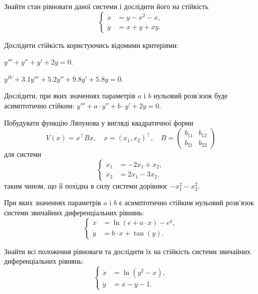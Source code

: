 \begin{problem}
	Знайти стан рівноваги даної системи і дослідити його на стійкість 
	\[\left\{ \begin{aligned} \dot x &= y - x^2 - x, \\ \dot y &= x + y + x y. \end{aligned} \right.\]
\end{problem}

Дослідити стійкість користуючись відомими критеріями:

\begin{problem}
	$y''' + y'' + y' + 2 y = 0$.
\end{problem}

\begin{problem}
	$y^{IV} + 3.1 y''' + 5.2 y'' + 9.8 y' + 5.8 y = 0$.
\end{problem}

\begin{problem}
	Дослідити, при яких значеннях параметрів $a$ і $b$ нульовий розв'язок буде асимптотично стійким: $y''' + a \cdot y'' + b \cdot y' + 2 y = 0$.
\end{problem}

\begin{problem}
	Побудувати функцію Ляпунова у вигляді квадратичної форми
	\[V(x) = x^\intercal B x, \quad x = (x_1, x_2)^\intercal, \quad B = \begin{pmatrix} b_{11} & b_{12} \\ b_{21} & b_{22} \end{pmatrix}\]
	для системи
	\[\left\{ \begin{aligned} \dot x_1 &= - 2 x_1 + x_2, \\ \dot x_2 &= 2 x_1 - 3 x_2, \end{aligned} \right.\]
	таким чином, що її похідна в силу системи дорівнює $-x_1^2 - x_2^2$.
\end{problem}

\begin{problem}
	При яких значеннях параметрів $a$ i $b$ є асимптотично стійким нульовий розв'язок системи звичайних диференціальних рівнянь:
	\[\left\{ \begin{aligned} \dot x &= \ln (e + a \cdot x) - e^y, \\ \dot y &= b \cdot x + \tan (y). \end{aligned} \right.\]
\end{problem}

\begin{problem}
	Знайти всі положення рівноваги та дослідити їх на стійкість системи звичайних диференціальних рівнянь:
	\[\left\{ \begin{aligned} \dot x &= \ln (y^2 - x), \\ \dot y &= x - y - 1. \end{aligned} \right.\]
\end{problem}

